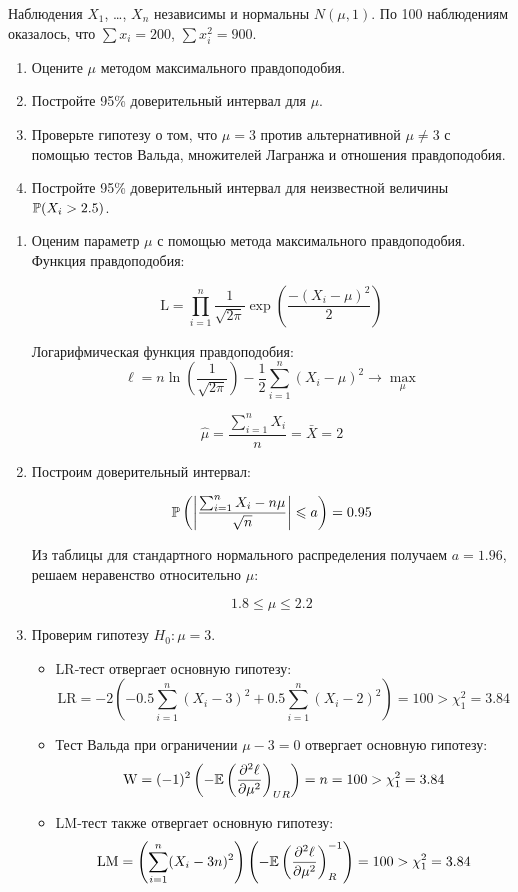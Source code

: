 \begin{problem}
Наблюдения $X_1$, \ldots, $X_n$ независимы и нормальны $N(\mu,1)$. По 100 наблюдениям оказалось, что $\sum x_i=200$, $\sum x_i^2=900$.
\begin{enumerate}
\item Оцените $\mu$ методом максимального правдоподобия.
\item Постройте 95\% доверительный интервал для $\mu$.
\item Проверьте гипотезу о том, что $\mu=3$ против альтернативной $\mu\neq 3$ с помощью тестов Вальда, множителей Лагранжа и отношения правдоподобия.
\item Постройте 95\% доверительный интервал для неизвестной величины $\P(X_i>2.5)$.
\end{enumerate}


\begin{sol}
\begin{enumerate}
\item Оценим параметр $\mu$ с помощью метода максимального правдоподобия. Функция правдоподобия:

\[
\text{L} = \prod_{i=1}^{n} \frac{1}{\sqrt{2\pi}}\exp\left( \frac{-\left( X_i -\mu\right) ^2}{2}\right)
\]

Логарифмическая функция правдоподобия:
\[\ell = n \ln \left( \frac{1}{\sqrt{2\pi}}\right) - \frac{1}{2}\sum_{i=1}^{n}\left( X_i-\mu\right) ^2 \to \max_\mu\]

\[\hat{\mu} = \frac{\sum_{i=1}^{n}X_i}{n} = \bar{X} = 2\]

\item Построим доверительный интервал:

\[\P\left(\left|\frac{\sum_{i=1}^{n}X_i - n\mu}{\sqrt{n}} \right| \leqslant a \right) = 0.95 \]

Из таблицы для стандартного нормального распределения получаем $a=1.96$, решаем неравенство относительно $\mu$:

\[1.8 \leqslant \mu \leqslant 2.2\]

\item Проверим гипотезу $H_0: \mu = 3$.
\begin{itemize}
  \item LR-тест отвергает основную гипотезу:
    \[\text{LR} = -2\left( -0.5\sum_{i=1}^{n}(X_i-3)^2+0.5\sum_{i=1}^{n}(X_i-2)^2\right)  = 100 > \chi^2_1 = 3.84\]
    \item Тест Вальда  при ограничении $\mu - 3 = 0$ отвергает основную гипотезу:
    \[\text{W} = (-1)^2\left(-\E\left(\frac{\partial^2 \ell}{\partial \mu^2}\right) _{UR}\right)  = n = 100 > \chi^2_1 = 3.84\]
    \item LM-тест также отвергает основную гипотезу:
    \[\text{LM} = \left(\sum_{i=1}^{n}(X_i-3n)^2\right) \left( -\E\left(\frac{\partial^2 \ell}{\partial \mu^2}\right)^{-1}_{R}\right) = 100 > \chi^2_1 = 3.84\]
\end{itemize}


\end{enumerate}
\end{sol}
\end{problem}

